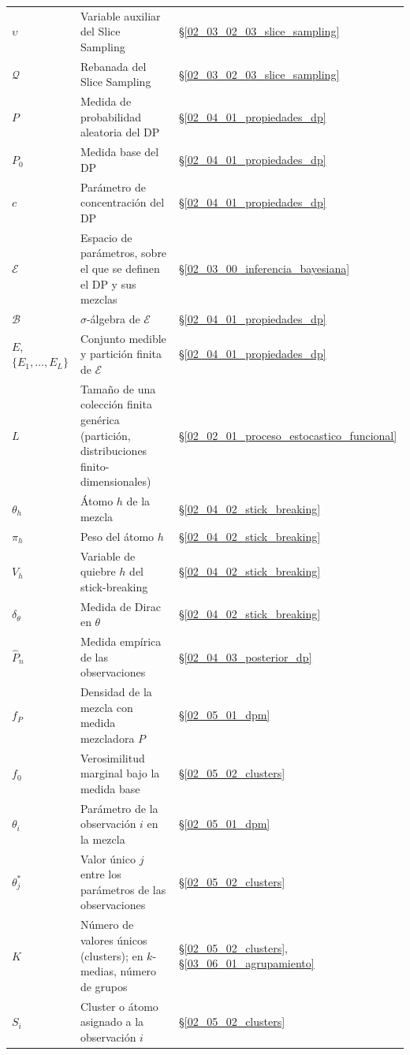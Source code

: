 \begin{longtable}{p{} p{} p{}}
$\upsilon$ & Variable auxiliar del Slice Sampling & \S\ref{02_03_02_03_slice_sampling} \\
$\mathcal{Q}$ & Rebanada del Slice Sampling & \S\ref{02_03_02_03_slice_sampling} \\
$P$ & Medida de probabilidad aleatoria del DP & \S\ref{02_04_01_propiedades_dp} \\
$P_0$ & Medida base del DP & \S\ref{02_04_01_propiedades_dp} \\
$c$ & Parámetro de concentración del DP & \S\ref{02_04_01_propiedades_dp} \\
$\mathcal{E}$ & Espacio de parámetros, sobre el que se definen el DP y sus mezclas & \S\ref{02_03_00_inferencia_bayesiana} \\
$\mathcal{B}$ & $\sigma$-álgebra de $\mathcal{E}$ & \S\ref{02_04_01_propiedades_dp} \\
$E$, $\{E_1, \dots, E_L\}$ & Conjunto medible y partición finita de $\mathcal{E}$ & \S\ref{02_04_01_propiedades_dp} \\
$L$ & Tamaño de una colección finita genérica (partición, distribuciones finito-dimensionales) & \S\ref{02_02_01_proceso_estocastico_funcional} \\
$\theta_h$ & Átomo $h$ de la mezcla & \S\ref{02_04_02_stick_breaking} \\
$\pi_h$ & Peso del átomo $h$ & \S\ref{02_04_02_stick_breaking} \\
$V_h$ & Variable de quiebre $h$ del stick-breaking & \S\ref{02_04_02_stick_breaking} \\
$\delta_{\theta}$ & Medida de Dirac en $\theta$ & \S\ref{02_04_02_stick_breaking} \\
$\widehat{P}_n$ & Medida empírica de las observaciones & \S\ref{02_04_03_posterior_dp} \\
$f_P$ & Densidad de la mezcla con medida mezcladora $P$ & \S\ref{02_05_01_dpm} \\
$f_0$ & Verosimilitud marginal bajo la medida base & \S\ref{02_05_02_clusters} \\
$\theta_i$ & Parámetro de la observación $i$ en la mezcla & \S\ref{02_05_01_dpm} \\
$\theta_j^*$ & Valor único $j$ entre los parámetros de las observaciones & \S\ref{02_05_02_clusters} \\
$K$ & Número de valores únicos (clusters); en $k$-medias, número de grupos & \S\ref{02_05_02_clusters}, \S\ref{03_06_01_agrupamiento} \\
$S_i$ & Cluster o átomo asignado a la observación $i$ & \S\ref{02_05_02_clusters} \\

\end{longtable}
